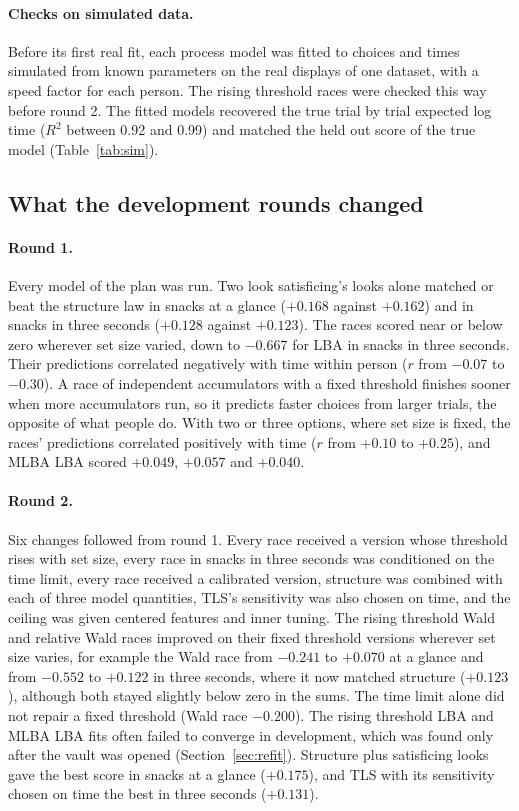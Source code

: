 \documentclass[11pt]{article}
\newcommand{\Rtwo}{R^2}
\begin{document}
\paragraph{Checks on simulated data.} Before its first real fit, each process model was fitted to choices and times simulated from known parameters on the real displays of one dataset, with a speed factor for each person. The rising threshold races were checked this way before round 2. The fitted models recovered the true trial by trial expected log time ($\Rtwo$ between 0.92 and 0.99) and matched the held out score of the true model (Table~\ref{tab:sim}).

\subsection{What the development rounds changed}

\paragraph{Round 1.} Every model of the plan was run. Two look satisficing's looks alone matched or beat the structure law in snacks at a glance ($+0.168$ against $+0.162$) and in snacks in three seconds ($+0.128$ against $+0.123$). The races scored near or below zero wherever set size varied, down to $-0.667$ for LBA in snacks in three seconds. Their predictions correlated negatively with time within person ($r$ from $-0.07$ to $-0.30$). A race of independent accumulators with a fixed threshold finishes sooner when more accumulators run, so it predicts faster choices from larger trials, the opposite of what people do. With two or three options, where set size is fixed, the races' predictions correlated positively with time ($r$ from $+0.10$ to $+0.25$), and MLBA LBA scored $+0.049$, $+0.057$ and $+0.040$.

\paragraph{Round 2.} Six changes followed from round 1. Every race received a version whose threshold rises with set size, every race in snacks in three seconds was conditioned on the time limit, every race received a calibrated version, structure was combined with each of three model quantities, TLS's sensitivity was also chosen on time, and the ceiling was given centered features and inner tuning. The rising threshold Wald and relative Wald races improved on their fixed threshold versions wherever set size varies, for example the Wald race from $-0.241$ to $+0.070$ at a glance and from $-0.552$ to $+0.122$ in three seconds, where it now matched structure ($+0.123$), although both stayed slightly below zero in the sums. The time limit alone did not repair a fixed threshold (Wald race $-0.200$). The rising threshold LBA and MLBA LBA fits often failed to converge in development, which was found only after the vault was opened (Section~\ref{sec:refit}). Structure plus satisficing looks gave the best score in snacks at a glance ($+0.175$), and TLS with its sensitivity chosen on time the best in three seconds ($+0.131$).
\end{document}
